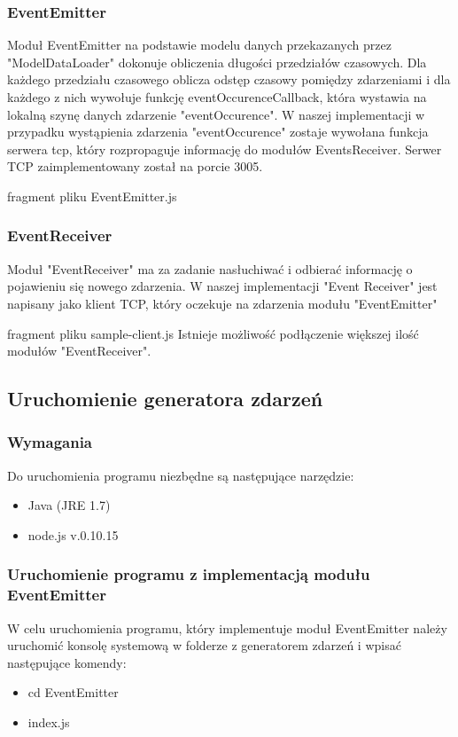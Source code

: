 \subsubsection{EventEmitter}
Moduł EventEmitter na podstawie modelu danych przekazanych przez "ModelDataLoader" dokonuje obliczenia długości przedziałów czasowych. Dla każdego przedziału czasowego oblicza odstęp czasowy pomiędzy zdarzeniami i dla każdego z nich wywołuje funkcję eventOccurenceCallback, która wystawia na lokalną szynę danych zdarzenie "eventOccurence". W naszej implementacji w przypadku wystąpienia zdarzenia "eventOccurence" zostaje wywołana funkcja serwera tcp, który rozpropaguje informację do modułów EventsReceiver. Serwer TCP zaimplementowany został na porcie 3005.

fragment pliku EventEmitter.js

\subsubsection{EventReceiver}
Moduł "EventReceiver" ma za zadanie nasłuchiwać i odbierać informację o pojawieniu się nowego zdarzenia. W naszej implementacji "Event Receiver" jest napisany jako klient TCP, który oczekuje na zdarzenia modułu "EventEmitter"

fragment pliku sample-client.js
Istnieje możliwość podłączenie większej ilość modułów "EventReceiver".


\subsection{Uruchomienie generatora zdarzeń}
\subsubsection{Wymagania}
Do uruchomienia programu niezbędne są następujące narzędzie:
\begin{itemize}[noitemsep]
  \item Java (JRE 1.7)
  \item node.js v.0.10.15
\end{itemize}
\subsubsection{Uruchomienie programu z implementacją modułu EventEmitter}
W celu uruchomienia programu, który implementuje moduł EventEmitter należy uruchomić konsolę systemową w folderze z generatorem zdarzeń i wpisać następujące komendy:
\begin{itemize}[noitemsep]
  \item cd EventEmitter
  \item index.js
\end{itemize}
